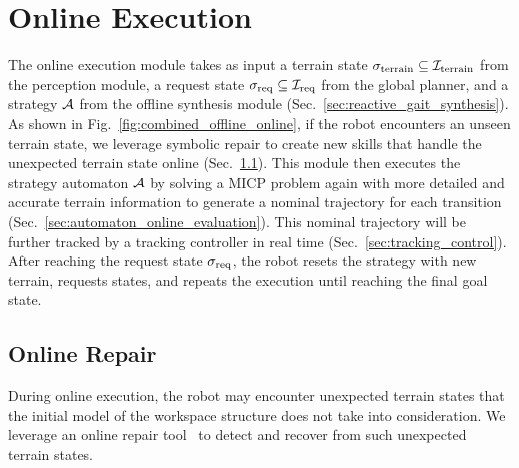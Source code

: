 \documentclass[letterpaper, 10 pt, conference]{ieeeconf}
\begin{document}
\section{Online Execution}\label{sec:online_execution}
The online execution module takes as input
a terrain state $\sigma_{\textrm{terrain}} \subseteq {\mathcal I}_{\textrm{terrain}}$
from the perception module, 
a request state $\sigma_{\textrm{req}} \subseteq {\mathcal I}_{\textrm{req}}$
from the global planner,
and a strategy ${\mathcal A}$
from the offline synthesis module (Sec.~\ref{sec:reactive_gait_synthesis}).
As shown in Fig.~\ref{fig:combined_offline_online},
if the robot encounters an unseen terrain state, 
we leverage symbolic repair to create new skills that handle the unexpected terrain state online 
(Sec.~\ref{sec:online_repair}).
This module then executes the strategy automaton ${\mathcal A}$
by solving a MICP problem again 
with more detailed and accurate terrain information 
to generate a nominal trajectory for each transition (Sec.~\ref{sec:automaton_online_evaluation}). This nominal trajectory will be further tracked by a tracking controller in real time
(Sec.~\ref{sec:tracking_control}).
After reaching the request state $\sigma_{\textrm{req}}$,
the robot resets the strategy with new terrain, requests states,
and repeats the execution
until reaching the final goal state.






\subsection{Online Repair}\label{sec:online_repair}
During online execution, 
the robot may encounter unexpected terrain states
that the initial model of the workspace structure does not take into consideration.
We leverage an online repair tool~\cite{meng2024automated} 
to detect and recover from such unexpected terrain states.
\end{document}
